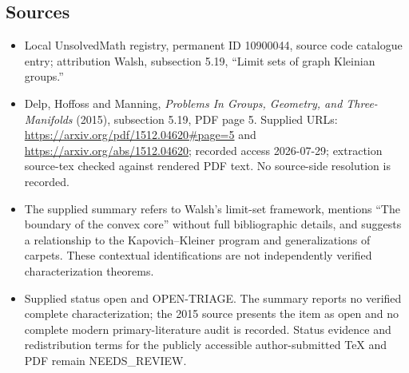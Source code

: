 \documentclass[11pt]{article}
\begin{document}
\subsection{Sources}
\begin{itemize}
\item Local UnsolvedMath registry, permanent ID 10900044, source code catalogue entry; attribution Walsh, subsection 5.19, ``Limit sets of graph Kleinian groups.''
\item Delp, Hoffoss and Manning, \emph{Problems In Groups, Geometry, and Three-Manifolds} (2015), subsection 5.19, PDF page 5. Supplied URLs: \url{https://arxiv.org/pdf/1512.04620#page=5} and \url{https://arxiv.org/abs/1512.04620}; recorded access 2026-07-29; extraction source-tex checked against rendered PDF text. No source-side resolution is recorded.
\item The supplied summary refers to Walsh's limit-set framework, mentions ``The boundary of the convex core'' without full bibliographic details, and suggests a relationship to the Kapovich--Kleiner program and generalizations of carpets. These contextual identifications are not independently verified characterization theorems.
\item Supplied status open and OPEN-TRIAGE. The summary reports no verified complete characterization; the 2015 source presents the item as open and no complete modern primary-literature audit is recorded. Status evidence and redistribution terms for the publicly accessible author-submitted TeX and PDF remain NEEDS\_REVIEW.
\end{itemize}
\end{document}
